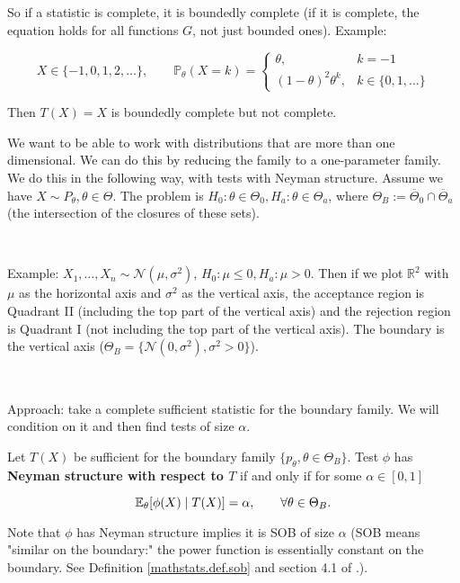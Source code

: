 So if a statistic is complete, it is boundedly complete (if it is complete, the equation holds for all functions \(G\), not just bounded ones). Example: 

\[
X \in \{-1, 0, 1, 2, \ldots \}, \qquad
\mathbb{P}_\theta(X = k) = \begin{cases}
 \theta, & k = -1 \\
(1 - \theta)^2 \theta^k, & k \in \{0, 1, \ldots\}
\end{cases}
\]

Then \(T(X) = X\) is boundedly complete but not complete.

We want to be able to work with distributions that are more than one dimensional. We can do this by reducing the family to a one-parameter family. We do this in the following way, with tests with Neyman structure. Assume we have \(X \sim P_\theta, \theta \in \Theta\). The problem is \(H_0: \theta \in \Theta_0, H_a: \theta \in \Theta_a\), where \(\Theta_B := \overline{\Theta}_0 \cap \overline{\Theta}_a\) (the intersection of the closures of these sets). 

\

Example: \(X_1, \ldots, X_n \sim \mathcal{N}(\mu, \sigma^2)\), \(H_0: \mu \leq 0, H_a: \mu > 0\). Then if we plot \(\mathbb{R}^2\) with \(\mu\) as the horizontal axis and \(\sigma^2\) as the vertical axis, the acceptance region is Quadrant II (including the top part of the vertical axis) and the rejection region is Quadrant I (not including the top part of the vertical axis). The boundary is the vertical axis (\(\Theta_B = \{\mathcal{N}(0, \sigma^2), \sigma^2 > 0\}\)).

\

Approach: take a complete sufficient statistic for the boundary family. We will condition on it and then find tests of size \(\alpha\). 


\begin{definition}\label{mathstats.def.neyman.structure}
Let \(T(X)\) be sufficient for the boundary family \(\{p_{\theta}, \theta \in \Theta_B\}\). Test \(\phi\) has \textbf{Neyman structure with respect to \(T\)} if and only if for some \(\alpha \in [0,1]\)

\[
\E_\theta [\phi(X) \mid T(X)] = \alpha, \qquad \forall \theta \in \Theta_B.
\]


\end{definition}

Note that \(\phi\) has Neyman structure implies it is SOB of size \(\alpha\) (SOB means "similar on the boundary:" the power function is essentially constant on the boundary. See Definition \ref{mathstats.def.sob} and section 4.1 of \citet{lehmann2005testing}.).

